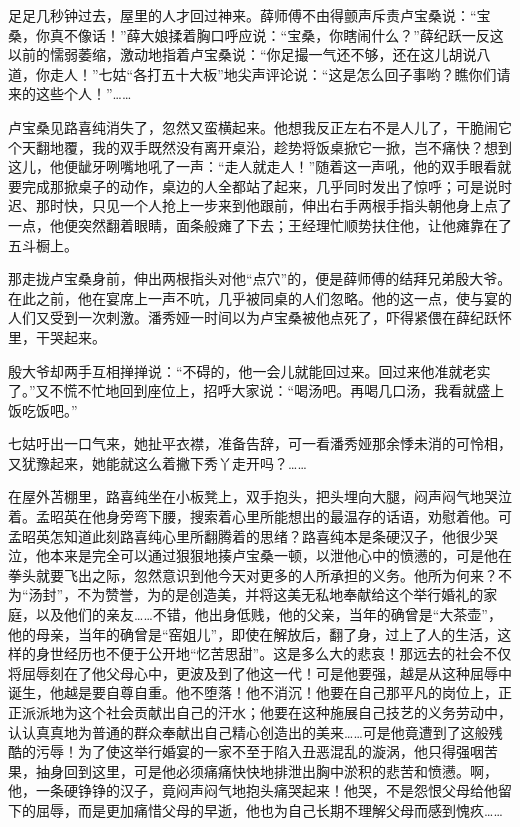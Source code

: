 \par 足足几秒钟过去，屋里的人才回过神来。薛师傅不由得颤声斥责卢宝桑说：“宝桑，你真不像话！”薛大娘揉着胸口呼应说：“宝桑，你瞎闹什么？”薛纪跃一反这以前的懦弱萎缩，激动地指着卢宝桑说：“你足撮一气还不够，还在这儿胡说八道，你走人！”七姑“各打五十大板”地尖声评论说：“这是怎么回子事哟？瞧你们请来的这些个人！”……
\par 卢宝桑见路喜纯消失了，忽然又蛮横起来。他想我反正左右不是人儿了，干脆闹它个天翻地覆，我的双手既然没有离开桌沿，趁势将饭桌掀它一掀，岂不痛快？想到这儿，他便龇牙咧嘴地吼了一声：“走人就走人！”随着这一声吼，他的双手眼看就要完成那掀桌子的动作，桌边的人全都站了起来，几乎同时发出了惊呼；可是说时迟、那时快，只见一个人抢上一步来到他跟前，伸出右手两根手指头朝他身上点了一点，他便突然翻着眼睛，面条般瘫了下去；王经理忙顺势扶住他，让他瘫靠在了五斗橱上。
\par 那走拢卢宝桑身前，伸出两根指头对他“点穴”的，便是薛师傅的结拜兄弟殷大爷。在此之前，他在宴席上一声不吭，几乎被同桌的人们忽略。他的这一点，使与宴的人们又受到一次刺激。潘秀娅一时间以为卢宝桑被他点死了，吓得紧偎在薛纪跃怀里，干哭起来。
\par 殷大爷却两手互相掸掸说：“不碍的，他一会儿就能回过来。回过来他准就老实了。”又不慌不忙地回到座位上，招呼大家说：“喝汤吧。再喝几口汤，我看就盛上饭吃饭吧。”
\par 七姑吁出一口气来，她扯平衣襟，准备告辞，可一看潘秀娅那余悸未消的可怜相，又犹豫起来，她能就这么着撇下秀丫走开吗？……
\par 在屋外苫棚里，路喜纯坐在小板凳上，双手抱头，把头埋向大腿，闷声闷气地哭泣着。孟昭英在他身旁弯下腰，搜索着心里所能想出的最温存的话语，劝慰着他。可孟昭英怎知道此刻路喜纯心里所翻腾着的思绪？路喜纯本是条硬汉子，他很少哭泣，他本来是完全可以通过狠狠地揍卢宝桑一顿，以泄他心中的愤懑的，可是他在拳头就要飞出之际，忽然意识到他今天对更多的人所承担的义务。他所为何来？不为“汤封”，不为赞誉，为的是创造美，并将这美无私地奉献给这个举行婚礼的家庭，以及他们的亲友……不错，他出身低贱，他的父亲，当年的确曾是“大茶壶”，他的母亲，当年的确曾是“窑姐儿”，即使在解放后，翻了身，过上了人的生活，这样的身世经历也不便于公开地“忆苦思甜”。这是多么大的悲哀！那远去的社会不仅将屈辱刻在了他父母心中，更波及到了他这一代！可是他要强，越是从这种屈辱中诞生，他越是要自尊自重。他不堕落！他不消沉！他要在自己那平凡的岗位上，正正派派地为这个社会贡献出自己的汗水；他要在这种施展自己技艺的义务劳动中，认认真真地为普通的群众奉献出自己精心创造出的美来……可是他竟遭到了这般残酷的污辱！为了使这举行婚宴的一家不至于陷入丑恶混乱的漩涡，他只得强咽苦果，抽身回到这里，可是他必须痛痛快快地排泄出胸中淤积的悲苦和愤懑。啊，他，一条硬铮铮的汉子，竟闷声闷气地抱头痛哭起来！他哭，不是怨恨父母给他留下的屈辱，而是更加痛惜父母的早逝，他也为自己长期不理解父母而感到愧疚……
